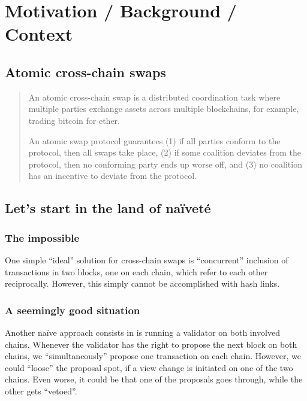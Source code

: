 \section{Motivation / Background / Context}

\subsection{Atomic cross-chain swaps}
\label{sec:atom-trans-across}

\begin{quote}
  An atomic cross-chain swap is 
  a distributed coordination task 
  where multiple parties exchange assets across multiple blockchains, 
  for example, trading bitcoin for ether.

  An atomic swap protocol guarantees 
  (1) if all parties conform to the protocol, 
  then all swaps take place, 
  (2) if some coalition deviates from the protocol, 
  then no conforming party ends up worse off, and 
  (3) no coalition has an incentive to deviate from the protocol.
\hfill\cite{podc18Herlihy} 
\end{quote}

\subsection{Let's start in the land of naïveté}
\label{sec:naivities}

\subsubsection{The impossible}
\label{sec:impossible-concurrency}

One simple ``ideal'' solution for cross-chain swaps is 
``concurrent''  inclusion of 
transactions in two blocks, one on each chain, 
which refer to each other reciprocally.
However, 
this simply cannot be accomplished with hash links.

\subsubsection{A seemingly good situation}
\label{sec:almost-safe}

Another naïve approach consists in
is running a validator on both involved chains. 
Whenever the validator has the right to propose 
the next block on both chains,
we “simultaneously” propose one transaction on each chain. 
However,
we could “loose” the proposal spot,
\eg if a view change is initiated on one of the two chains.
Even worse,
it could be that one of the proposals goes through,
while the other gets “vetoed”.

